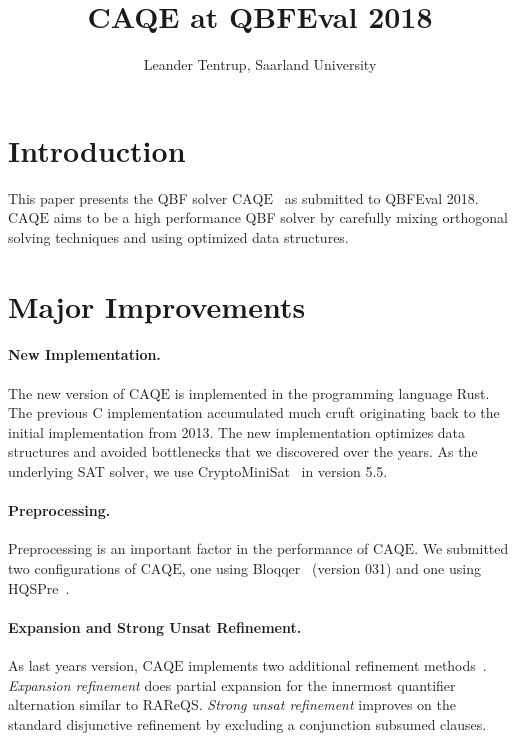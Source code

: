\documentclass[11pt,twocolumn]{article}
\title{CAQE at QBFEval 2018}
\author{Leander Tentrup, Saarland University}
\date{}
\newcommand{\caqe}{\text{CAQE}}
\begin{document}
  \maketitle
  
\section{Introduction}

This paper presents the QBF solver $\caqe$~\cite{conf/fmcad/RabeT15} as submitted to QBFEval 2018.
$\caqe$ aims to be a high performance QBF solver by carefully mixing orthogonal solving techniques and using optimized data structures.

\section{Major Improvements}

\paragraph{New Implementation.}

The new version of $\caqe$ is implemented in the programming language Rust.
The previous C implementation accumulated much cruft originating back to the initial implementation from 2013.
The new implementation optimizes data structures and avoided bottlenecks that we discovered over the years.
As the underlying SAT solver, we use CryptoMiniSat~\cite{conf/sat/SoosNC09} in version 5.5.

\paragraph{Preprocessing.}

Preprocessing is an important factor in the performance of $\caqe$.
We submitted two configurations of $\caqe$, one using Bloqqer~\cite{conf/cade/BiereLS11} (version 031) and one using HQSPre~\cite{conf/tacas/WimmerRM017}.

\paragraph{Expansion and Strong Unsat Refinement.}

As last years version, $\caqe$ implements two additional refinement methods~\cite{conf/cav/Tentrup17}.
\emph{Expansion refinement} does partial expansion for the innermost quantifier alternation similar to RAReQS.
\emph{Strong unsat refinement} improves on the standard disjunctive refinement by excluding a conjunction subsumed clauses.
\end{document}
